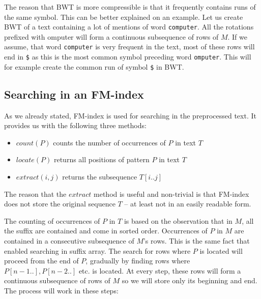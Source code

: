 The reason that BWT is more compressible is that it frequently contains runs of the same
symbol. This can be better explained on an example. Let us create BWT of a text containing
a lot of mentions of word {\tt computer}. All the rotations prefixed with omputer will form a
continuous subsequence of rows of $M$. If we assume, that word {\tt computer} is very frequent
in the text, most of these rows will end in {\tt \$} as this is the most common symbol preceding
word {\tt omputer}. This will for example create the common run of symbol {\tt \$} in BWT.

\subsection{Searching in an FM-index}

As we already stated, FM-index is used for searching in the preprocessed text.
It provides us with the following three methods:

\begin{itemize}
	\item $\mathit{count}(P)$ counts the number of occurrences of $P$ in text $T$
	\item $\mathit{locate}(P)$ returns all positions of pattern $P$ in text $T$
	\item $\mathit{extract}(i, j)$ returns the subsequence $T[i..j]$
\end{itemize}

The reason that the $\mathit{extract}$ method is useful and non-trivial is that FM-index
does not store the original sequence $T$ -- at least not in an easily readable form.

The counting of occurrences of $P$ in $T$ is based on the observation that in $M$,
all the suffix are contained and come in sorted order. Occurrences of $P$ in $M$
are contained in a consecutive subsequence of $M$'s rows. This is the same fact that
enabled searching in suffix array. The search for rows where $P$ is located will proceed
from the end of $P$, gradually by finding rows where $P[n-1..], P[n-2..]$ etc. is located.
At every step, these rows will form a continuous subsequence of rows of $M$ so we will store
only its beginning and end. The process will work in these steps:

